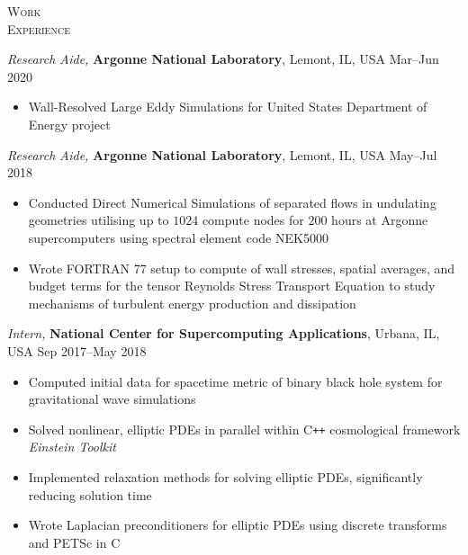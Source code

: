 \documentclass[10pt]{article}
\begin{document}
\begin{multicols}{2}
\textsc{\small Work \\ Experience}
\columnbreak

{\sl Research Aide,} \textbf{Argonne National Laboratory}, Lemont, IL, USA \hfill Mar--Jun 2020

\vspace{-1.75em}
\begin{itemize}[label=-]
    \setlength\itemsep{-0.25em}
    \item Wall-Resolved Large Eddy Simulations for United States Department of Energy project
\end{itemize}
\vspace{-2.0em}

\vspace{0.5em}
%
{\sl Research Aide,} \textbf{Argonne National Laboratory}, Lemont, IL, USA \hfill May--Jul 2018

\vspace{-1.75em}
\begin{itemize}[label=-]
    \setlength\itemsep{-0.25em}
    \item Conducted Direct Numerical Simulations of separated flows in undulating geometries utilising up to $1024$ compute nodes for $200$ hours at Argonne supercomputers using spectral element code NEK5000
    \item Wrote FORTRAN 77 setup to compute of wall stresses, spatial averages, and budget terms for the tensor Reynolds Stress Transport Equation to study mechanisms of turbulent energy production and dissipation
\end{itemize}
\vspace{-2.0em}

\vspace{0.5em}
%
{\sl Intern,} \textbf{National Center for Supercomputing Applications}, Urbana, IL, USA \hfill Sep 2017--May 2018

\vspace{-1.75em}
\begin{itemize}[label=-]
    \setlength\itemsep{-0.25em}
    \item Computed initial data for spacetime metric of binary black hole system for gravitational wave simulations
    \item Solved nonlinear, elliptic PDEs in parallel within C\texttt{++} cosmological framework \textit{Einstein Toolkit}
    \item Implemented relaxation methods for solving elliptic PDEs, significantly reducing solution time
    \item Wrote Laplacian preconditioners for elliptic PDEs using discrete transforms and PETSc in C
\end{itemize}
\vspace{-2.0em}


\end{multicols}
\end{document}

